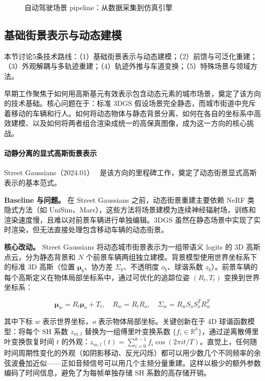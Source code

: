 \begin{figure}[htbp]
\centering
\resizebox{\textwidth}{!}{}
\caption{自动驾驶场景 pipeline：从数据采集到仿真引擎}
\label{fig:ch18_driving_pipeline}
\end{figure}

\subsection{基础街景表示与动态建模}

本节讨论5条技术路线：（1）基础街景表示与动态建模；（2）前馈与可泛化重建；（3）外观解耦与多轨迹重建；（4）轨迹外推与车道变换；（5）特殊场景与领域方法。

早期工作聚焦于如何用高斯基元有效表示包含动态元素的城市场景，奠定了该方向的技术基础。核心问题在于：标准 3DGS 假设场景完全静态，而城市街道中充斥着移动的车辆和行人。如何将动态物体与静态背景分离、如何在各自的坐标系中高效建模、以及如何将两者组合渲染成统一的高保真图像，成为这一方向的核心挑战。

\paragraph{动静分离的显式高斯街景表示}

Street Gaussians（2024.01）~\cite{2401_01339} 是该方向的里程碑工作，奠定了动态街景显式高斯表示的基本范式。

\textbf{Baseline 与问题。} 在 Street Gaussians 之前，动态街景重建主要依赖 NeRF 类隐式方法（如 UniSim、Mars），这些方法将场景建模为连续神经辐射场，训练和渲染速度慢，且难以对前景车辆进行单独编辑。3DGS 虽然在静态场景中实现了实时渲染，但无法直接处理包含移动车辆的动态街景。

\textbf{核心改动。} Street Gaussians 将动态城市街景表示为一组带语义 logits 的 3D 高斯点云，分为静态背景和 $N$ 个前景车辆两组独立建模。背景模型使用世界坐标系下的标准 3D 高斯（位置 $\boldsymbol{\mu}_b$、协方差 $\Sigma_b$、不透明度 $o_b$、球谐系数 $z_b$）。前景车辆的每个高斯定义在物体局部坐标系中，通过可优化的追踪位姿 $(R_t, T_t)$ 变换到世界坐标系：

\begin{equation*}
\boldsymbol{\mu}_w = R_t \boldsymbol{\mu}_o + T_t, \quad R_w = R_t R_o, \quad \Sigma_w = R_w S_o S_o^T R_w^T
\end{equation*}

其中下标 $w$ 表示世界坐标，$o$ 表示物体局部坐标。关键创新在于 4D 球谐函数模型：将每个 SH 系数 $z_{m,l}$ 替换为一组傅里叶变换系数 $\{f_i \in \mathbb{R}^k\}$，通过逆离散傅里叶变换恢复时间 $t$ 的外观：$z_{m,l}(t) = \sum_{i=0}^{k-1} f_i \cos(2\pi i t / T)$。直觉上，任何随时间周期性变化的外观（如阴影移动、反光闪烁）都可以用少数几个不同频率的余弦波叠加近似——正如音频信号可以用几个主频分量重建。这样以极少的额外参数编码了时间信息，避免了为每帧单独存储 SH 系数的高存储开销。

